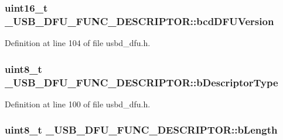\subsubsection[{\texorpdfstring{bcd\+D\+F\+U\+Version}{bcdDFUVersion}}]{\setlength{\rightskip}{0pt plus 5cm}uint16\+\_\+t \+\_\+\+U\+S\+B\+\_\+\+D\+F\+U\+\_\+\+F\+U\+N\+C\+\_\+\+D\+E\+S\+C\+R\+I\+P\+T\+O\+R\+::bcd\+D\+F\+U\+Version}\hypertarget{struct__USB__DFU__FUNC__DESCRIPTOR_acc4e2bf500911850131421896697e503}{}\label{struct__USB__DFU__FUNC__DESCRIPTOR_acc4e2bf500911850131421896697e503}


Definition at line 104 of file usbd\+\_\+dfu.\+h.

\subsubsection[{\texorpdfstring{b\+Descriptor\+Type}{bDescriptorType}}]{\setlength{\rightskip}{0pt plus 5cm}uint8\+\_\+t \+\_\+\+U\+S\+B\+\_\+\+D\+F\+U\+\_\+\+F\+U\+N\+C\+\_\+\+D\+E\+S\+C\+R\+I\+P\+T\+O\+R\+::b\+Descriptor\+Type}\hypertarget{struct__USB__DFU__FUNC__DESCRIPTOR_a89748491aeed40b066125858de36f32a}{}\label{struct__USB__DFU__FUNC__DESCRIPTOR_a89748491aeed40b066125858de36f32a}


Definition at line 100 of file usbd\+\_\+dfu.\+h.

\subsubsection[{\texorpdfstring{b\+Length}{bLength}}]{\setlength{\rightskip}{0pt plus 5cm}uint8\+\_\+t \+\_\+\+U\+S\+B\+\_\+\+D\+F\+U\+\_\+\+F\+U\+N\+C\+\_\+\+D\+E\+S\+C\+R\+I\+P\+T\+O\+R\+::b\+Length}\hypertarget{struct__USB__DFU__FUNC__DESCRIPTOR_a87a03979bd723f81bb50ef42b306293e}{}\label{struct__USB__DFU__FUNC__DESCRIPTOR_a87a03979bd723f81bb50ef42b306293e}


